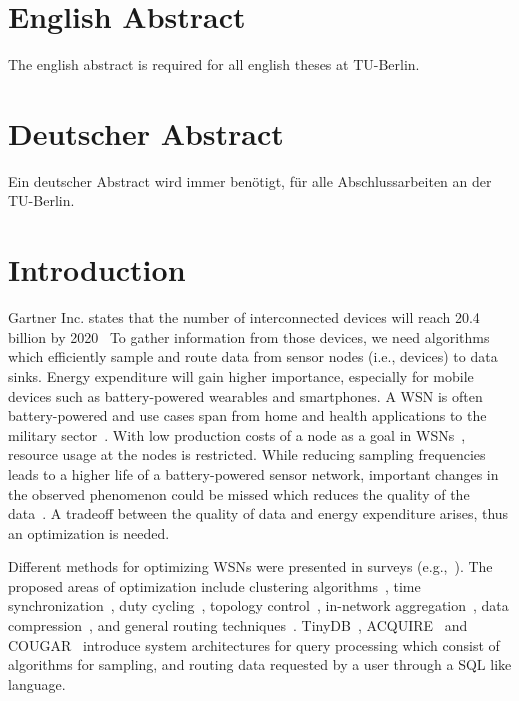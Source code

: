 
\section{English Abstract}
\begin{onehalfspace}
	
	The english abstract is required for all english theses at TU-Berlin.
\end{onehalfspace}
\clearpage

\section{Deutscher Abstract}
\begin{onehalfspace}
	
	Ein deutscher Abstract wird immer benötigt, für alle Abschlussarbeiten an
	der TU-Berlin. 
\end{onehalfspace}
\clearpage


\section{Introduction}
\label{sec:Introduction}
Gartner Inc. states that the number of interconnected devices will reach 20.4
billion by 2020~\cite{gartner} To gather information from those devices, we
need algorithms which efficiently sample and route data from sensor nodes
(i.e., devices) to data sinks. Energy expenditure will gain higher importance,
especially for mobile devices such as battery-powered wearables and
smartphones. A \ac{WSN} is often battery-powered and use cases span from home
and health applications to the military sector~\cite{akyildiz2002wireless}.
With low production costs of a node as a goal in
\acp{WSN}~\cite{akyildiz2002wireless}, resource usage at the nodes is
restricted. While reducing sampling frequencies leads to a higher life of a
battery-powered sensor network, important changes in the observed phenomenon
could be missed which reduces the quality of the
data~\cite{akyildiz2002wireless}. A tradeoff between the quality of data and
energy expenditure arises, thus an optimization is needed. 
\par
Different methods for optimizing \acp{WSN} were presented in surveys
(e.g.,~\cite{abbasi2007survey, sivrikaya2004time, carrano2014survey}). The
proposed areas of optimization include clustering
algorithms~\cite{abbasi2007survey}, time
synchronization~\cite{sivrikaya2004time}, duty
cycling~\cite{carrano2014survey}, topology control~\cite{li2013survey},
in-network aggregation~\cite{fasolo2007network}, data
compression~\cite{srisooksai2012practical}, and general routing
techniques~\cite{al2004routing, kulkarni2011particle, singh2015survey,
rault2014energy}. TinyDB~\cite{madden2005tinydb},
ACQUIRE~\cite{sadagopan2003acquire} and COUGAR~\cite{yao2002cougar} introduce
system architectures for query processing which consist of algorithms for
sampling, and routing data requested by a user through a \ac{SQL} like
language.


